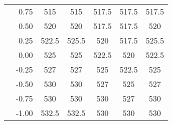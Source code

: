 \begin{tabular}{l | r | ccccc}
    & 0.75  & \cellcolor{white!76!gray}515    & \cellcolor{white!76!gray}515    & \cellcolor{white!68!gray}517.5  & \cellcolor{white!68!gray}517.5  & \cellcolor{white!68!gray}517.5  \\
    & 0.50  & \cellcolor{white!60!gray}520    & \cellcolor{white!60!gray}520    & \cellcolor{white!68!gray}517.5  & \cellcolor{white!68!gray}517.5  & \cellcolor{white!60!gray}520    \\
    & 0.25  & \cellcolor{white!52!gray}522.5  & \cellcolor{white!36!gray}525.5  & \cellcolor{white!60!gray}520    & \cellcolor{white!68!gray}517.5  & \cellcolor{white!36!gray}525.5  \\
    & 0.00  & \cellcolor{white!44!gray}525    & \cellcolor{white!44!gray}525    & \cellcolor{white!52!gray}522.5  & \cellcolor{white!60!gray}520    & \cellcolor{white!52!gray}522.5  \\
    & -0.25 & \cellcolor{white!28!gray}527    & \cellcolor{white!20!gray}527    & \cellcolor{white!44!gray}525    & \cellcolor{white!52!gray}522.5  & \cellcolor{white!44!gray}525    \\
    & -0.50  & \cellcolor{white!12!gray}530    & \cellcolor{white!12!gray}530    & \cellcolor{white!20!gray}527    & \cellcolor{white!44!gray}525    & \cellcolor{white!20!gray}527    \\
    & -0.75 & \cellcolor{white!12!gray}530    & \cellcolor{white!12!gray}530    & \cellcolor{white!12!gray}530    & \cellcolor{white!20!gray}527    & \cellcolor{white!12!gray}530    \\
    & -1.00 & \cellcolor{white!8!gray}532.5   & \cellcolor{white!8!gray}532.5   & \cellcolor{white!12!gray}530    & \cellcolor{white!12!gray}530    & \cellcolor{white!12!gray}530    \\
\hline\hline
\end{tabular}
